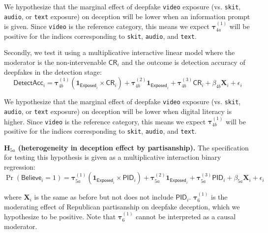 \documentclass[12pt,letterpaper]{article}
\begin{document}
\noindent We hypothesize that the marginal effect of deepfake \texttt{video} exposure (vs. \texttt{skit}, \texttt{audio}, or \texttt{text} exposure) on deception will be lower when an information prompt is given. Since \texttt{video} is the reference category, this means we expect $\bm{\tau}_{4a}^{(1)}$ will be positive for the indices corresponding to \texttt{skit}, \texttt{audio}, and \texttt{text}. %

Secondly, we test it using a multiplicative interactive linear model where the moderator is the non-intervenable $\textsf{CR}_i$ and the outcome is detection accuracy of deepfakes in the detection stage:
\begin{equation}
    \textsf{DetectAcc}_i = \bm{\tau}_{4b}^{(1)} (\mathbf{1}_{\textsf{Exposed}_i} \times \textsf{CR}_i)
    + \bm{\tau}_{4b}^{(2)}\mathbf{1}_{\textsf{Exposed}_i} + \bm{\tau}_{4b}^{(3)}\textsf{CR}_i +  \beta_{4b}\mathbf{X}_i + \epsilon_i
\end{equation}

\noindent We hypothesize that the marginal effect of deepfake \texttt{video} exposure (vs. \texttt{skit}, \texttt{audio}, or \texttt{text} exposure)  on deception will be lower when digital literacy is higher. Since \texttt{video} is the reference category, this means we expect $\bm{\tau}_{4b}^{(1)}$ will be positive for the indices corresponding to \texttt{skit}, \texttt{audio}, and \texttt{text}. %

\noindent \textbf{H$_{5a}$ (heterogeneity in deception effect by partisanship).} The specification for testing this hypothesis is given as a multiplicative interaction binary regression:
\begin{equation}
    \Pr(\textsf{Believe}_i=1) = \bm{\tau}_{5a}^{(1)} (\mathbf{1}_{\textsf{Exposed}_i} \times \textsf{PID}_i)
    + \bm{\tau}_{5a}^{(2)}\mathbf{1}_{\textsf{Exposed}_i} + \bm{\tau}_{5a}^{(3)}\textsf{PID}_i +  \beta_{5a}\mathbf{X}_i + \epsilon_i
\end{equation}

\noindent where $\mathbf{X}_i$ is the same as before but not does not include $\textsf{PID}_i$. $\bm{\tau}_{6}^{(1)}$ is the moderating effect of Republican partisanship on deepfake deception, which we hypothesize to be positive. Note that $\bm{\tau}_{6}^{(1)}$ cannot be interpreted as a causal moderator. 
\end{document}
